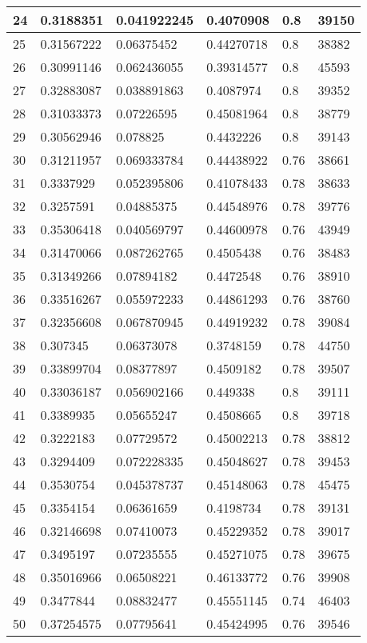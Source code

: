 \begin{longtable}{|l|l|l|l|l|l|}
24 & 0.3188351 & 0.041922245 & 0.4070908 & 0.8 & 39150 \\ \hline 
25 & 0.31567222 & 0.06375452 & 0.44270718 & 0.8 & 38382 \\ \hline 
26 & 0.30991146 & 0.062436055 & 0.39314577 & 0.8 & 45593 \\ \hline 
27 & 0.32883087 & 0.038891863 & 0.4087974 & 0.8 & 39352 \\ \hline 
28 & 0.31033373 & 0.07226595 & 0.45081964 & 0.8 & 38779 \\ \hline 
29 & 0.30562946 & 0.078825 & 0.4432226 & 0.8 & 39143 \\ \hline 
30 & 0.31211957 & 0.069333784 & 0.44438922 & 0.76 & 38661 \\ \hline 
31 & 0.3337929 & 0.052395806 & 0.41078433 & 0.78 & 38633 \\ \hline 
32 & 0.3257591 & 0.04885375 & 0.44548976 & 0.78 & 39776 \\ \hline 
33 & 0.35306418 & 0.040569797 & 0.44600978 & 0.76 & 43949 \\ \hline 
34 & 0.31470066 & 0.087262765 & 0.4505438 & 0.76 & 38483 \\ \hline 
35 & 0.31349266 & 0.07894182 & 0.4472548 & 0.76 & 38910 \\ \hline 
36 & 0.33516267 & 0.055972233 & 0.44861293 & 0.76 & 38760 \\ \hline 
37 & 0.32356608 & 0.067870945 & 0.44919232 & 0.78 & 39084 \\ \hline 
38 & 0.307345 & 0.06373078 & 0.3748159 & 0.78 & 44750 \\ \hline 
39 & 0.33899704 & 0.08377897 & 0.4509182 & 0.78 & 39507 \\ \hline 
40 & 0.33036187 & 0.056902166 & 0.449338 & 0.8 & 39111 \\ \hline 
41 & 0.3389935 & 0.05655247 & 0.4508665 & 0.8 & 39718 \\ \hline 
42 & 0.3222183 & 0.07729572 & 0.45002213 & 0.78 & 38812 \\ \hline 
43 & 0.3294409 & 0.072228335 & 0.45048627 & 0.78 & 39453 \\ \hline 
44 & 0.3530754 & 0.045378737 & 0.45148063 & 0.78 & 45475 \\ \hline 
45 & 0.3354154 & 0.06361659 & 0.4198734 & 0.78 & 39131 \\ \hline 
46 & 0.32146698 & 0.07410073 & 0.45229352 & 0.78 & 39017 \\ \hline 
47 & 0.3495197 & 0.07235555 & 0.45271075 & 0.78 & 39675 \\ \hline 
48 & 0.35016966 & 0.06508221 & 0.46133772 & 0.76 & 39908 \\ \hline 
49 & 0.3477844 & 0.08832477 & 0.45551145 & 0.74 & 46403 \\ \hline 
50 & 0.37254575 & 0.07795641 & 0.45424995 & 0.76 & 39546 \\ \hline 
\end{longtable}